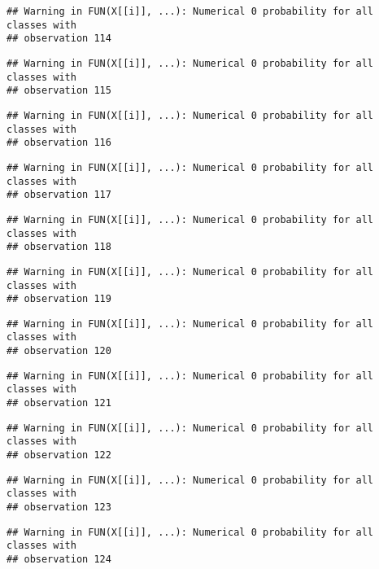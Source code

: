 \documentclass[
]{article}
\begin{document}
\begin{verbatim}
## Warning in FUN(X[[i]], ...): Numerical 0 probability for all classes with
## observation 114
\end{verbatim}

\begin{verbatim}
## Warning in FUN(X[[i]], ...): Numerical 0 probability for all classes with
## observation 115
\end{verbatim}

\begin{verbatim}
## Warning in FUN(X[[i]], ...): Numerical 0 probability for all classes with
## observation 116
\end{verbatim}

\begin{verbatim}
## Warning in FUN(X[[i]], ...): Numerical 0 probability for all classes with
## observation 117
\end{verbatim}

\begin{verbatim}
## Warning in FUN(X[[i]], ...): Numerical 0 probability for all classes with
## observation 118
\end{verbatim}

\begin{verbatim}
## Warning in FUN(X[[i]], ...): Numerical 0 probability for all classes with
## observation 119
\end{verbatim}

\begin{verbatim}
## Warning in FUN(X[[i]], ...): Numerical 0 probability for all classes with
## observation 120
\end{verbatim}

\begin{verbatim}
## Warning in FUN(X[[i]], ...): Numerical 0 probability for all classes with
## observation 121
\end{verbatim}

\begin{verbatim}
## Warning in FUN(X[[i]], ...): Numerical 0 probability for all classes with
## observation 122
\end{verbatim}

\begin{verbatim}
## Warning in FUN(X[[i]], ...): Numerical 0 probability for all classes with
## observation 123
\end{verbatim}

\begin{verbatim}
## Warning in FUN(X[[i]], ...): Numerical 0 probability for all classes with
## observation 124
\end{verbatim}
\end{document}
